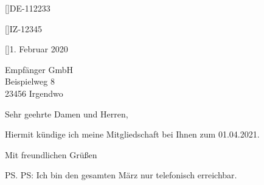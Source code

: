 \documentclass[privat-2]{scrlttr2}
\begin{document}


[\customername]{DE-112233}

[\yourrefname]{IZ-12345}

[\yourmailname]{1. Februar 2020}

\begin{letter}{
  Empfänger GmbH \\
  Beispielweg 8 \\
  23456 Irgendwo
}

\opening{Sehr geehrte Damen und Herren,}

Hiermit kündige ich meine Mitgliedschaft bei Ihnen zum 01.04.2021.

\lipsum[1-3]

\closing{Mit freundlichen Grüßen}

\ps PS: Ich bin den gesamten März nur telefonisch erreichbar.



\end{letter}
\end{document}
